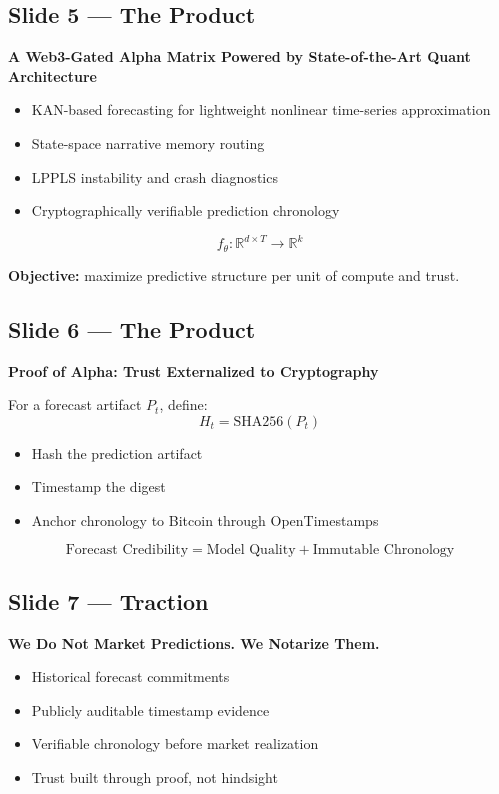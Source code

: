 \documentclass[11pt]{article}
\newcommand{\decktitle}[1]{
  \vspace{0.5em}
  {\Large\bfseries\color{wolfred} #1}
  \vspace{0.5em}
}
\begin{document}
\subsection*{Slide 5 --- The Product}
\begin{slidebox}
\decktitle{A Web3-Gated Alpha Matrix Powered by State-of-the-Art Quant Architecture}
\begin{itemize}[leftmargin=1.5em]
  \item KAN-based forecasting for lightweight nonlinear time-series approximation
  \item State-space narrative memory routing
  \item LPPLS instability and crash diagnostics
  \item Cryptographically verifiable prediction chronology
\end{itemize}

\[
f_\theta : \mathbb{R}^{d \times T} \to \mathbb{R}^k
\]

\textbf{Objective:} maximize predictive structure per unit of compute and trust.
\end{slidebox}

\subsection*{Slide 6 --- The Product}
\begin{slidebox}
\decktitle{Proof of Alpha: Trust Externalized to Cryptography}
For a forecast artifact \(P_t\), define:
\[
H_t = \mathrm{SHA256}(P_t)
\]

\begin{itemize}[leftmargin=1.5em]
  \item Hash the prediction artifact
  \item Timestamp the digest
  \item Anchor chronology to Bitcoin through OpenTimestamps
\end{itemize}

\[
\text{Forecast Credibility} = \text{Model Quality} + \text{Immutable Chronology}
\]
\end{slidebox}

\subsection*{Slide 7 --- Traction}
\begin{slidebox}
\decktitle{We Do Not Market Predictions. We Notarize Them.}
\begin{itemize}[leftmargin=1.5em]
  \item Historical forecast commitments
  \item Publicly auditable timestamp evidence
  \item Verifiable chronology before market realization
  \item Trust built through proof, not hindsight
\end{itemize}
\end{slidebox}
\end{document}
